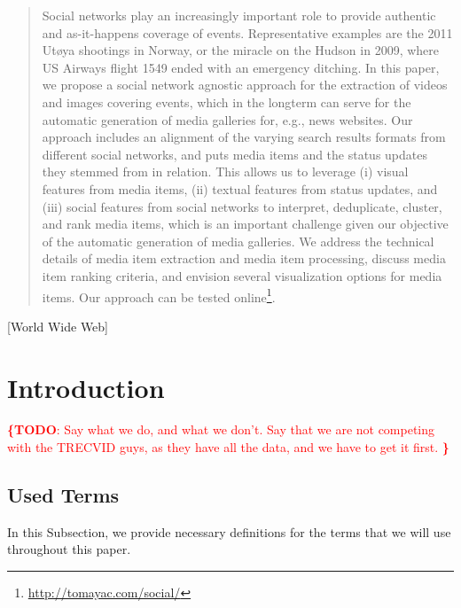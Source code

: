 \documentclass{acm_proc_article-sp}
\newcommand{\todo}[1]{\noindent\textcolor{red}{{\bf \{TODO}: #1{\bf \}}}}
\newcommand{\inlinelistingsize}{\fontsize{8pt}{11pt}}
\let\oldurl\url
\renewcommand{\url}[1]{\inlinelistingsize\oldurl{#1}}
\begin{document}
\begin{abstract}
Social networks play an increasingly important role to provide authentic and as-it-happens coverage of events.
Representative examples are the 2011 Ut{\o}ya shootings in Norway, or the miracle on the Hudson in 2009,
where US Airways flight 1549 ended with an emergency ditching.
In this paper, we propose a social network agnostic approach for the extraction of videos and images covering events, which in the longterm can serve for the automatic generation of media galleries for, e.g., news websites.
Our approach includes an alignment of the varying search results formats from different social networks,
and puts media items and the status updates they stemmed from in relation. 
This allows us to leverage (i) visual features from media items, (ii) textual features from status updates, and (iii) social features from social networks to interpret, deduplicate, cluster, and rank media items,
which is an important challenge given our objective of the automatic generation of media galleries.
We address the technical details of media item extraction and media item processing,
discuss media item ranking criteria,
and envision several visualization options for media items.
Our approach can be tested online\footnote{\url{http://tomayac.com/social/}}.
\end{abstract}

[World Wide Web]

\keywords{\todo{Keywords}}

\section{Introduction} \label{sec:introduction}
\todo{
Say what we do, and what we don't.
Say that we are not competing with the TRECVID guys, as they have all the data, and we have to get it first.
}

\subsection{Used Terms}
In this Subsection, we provide necessary definitions for the terms that we will use throughout this paper.
\end{document}
